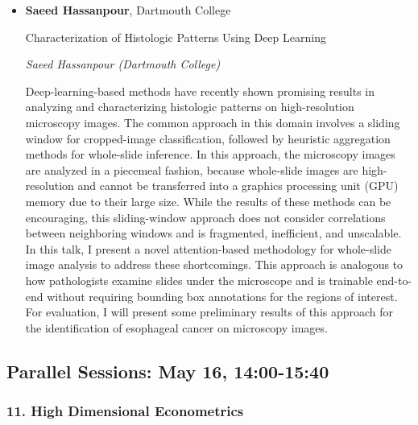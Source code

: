 \begin{itemize}
\item \textbf{Saeed Hassanpour}, Dartmouth College

Characterization of Histologic Patterns Using Deep Learning

\emph{\footnotesize Saeed Hassanpour (Dartmouth College)}

Deep-learning-based methods have recently shown promising results in analyzing and characterizing histologic patterns on high-resolution microscopy images. The common approach in this domain involves a sliding window for cropped-image classification, followed by heuristic aggregation methods for whole-slide inference. In this approach, the microscopy images are analyzed in a piecemeal fashion, because whole-slide images are high-resolution and cannot be transferred into a graphics processing unit (GPU) memory due to their large size. While the results of these methods can be encouraging, this sliding-window approach does not consider correlations between neighboring windows and is fragmented, inefficient, and unscalable. In this talk, I present a novel attention-based methodology for whole-slide image analysis to address these shortcomings. This approach is analogous to how pathologists examine slides under the microscope and is trainable end-to-end without requiring bounding box annotations for the regions of interest. For evaluation, I will present some preliminary results of this approach for the identification of esophageal cancer on microscopy images.

\end{itemize}

\subsection*{Parallel Sessions: May 16, 14:00-15:40}

\subsubsection*{11. High Dimensional Econometrics}

